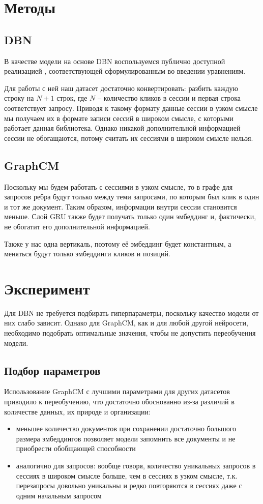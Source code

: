 \documentclass[diploma]{nanolab2015}
\begin{document}
\section{Методы}
\subsection{DBN}
В качестве модели на основе DBN воспользуемся публично доступной реализацией \cite{dbngithub}, соответствующей сформулированным во введении уравнениям.

Для работы с ней наш датасет достаточно конвертировать: разбить каждую строку на $N+1$ строк, где $N$ -- количество кликов в сессии и первая строка соответствует запросу. Приводя к такому формату данные сессии в узком смысле мы получаем их в формате записи сессий в широком смысле, с которыми работает данная библиотека. Однако никакой дополнительной информацией сессии не обогащаются, потому считать их сессиями в широком смысле нельзя.

\subsection{GraphCM}
Поскольку мы будем работать с сессиями в узком смысле, то в графе для запросов ребра будут только между теми запросами, по которым был клик в один и тот же документ. Таким образом, информации внутри сессии становится меньше. Слой GRU также будет получать только один эмбеддинг и, фактически, не обогатит его дополнительной информацией.

Также у нас одна вертикаль, поэтому её эмбеддинг будет константным, а меняться будут только эмбеддинги кликов и позиций.
\section{Эксперимент}
Для DBN не требуется подбирать гиперпараметры, поскольку качество модели от них слабо зависит. Однако для GraphCM, как и для любой другой нейросети, необходимо подобрать оптимальные значения, чтобы не допустить переобучения модели.
\subsection{Подбор параметров}
Использование GraphCM с лучшими параметрами для других датасетов приводило к переобучению, что достаточно обоснованно из-за различий в количестве данных, их природе и организации:
\begin{itemize}
    \item меньшее количество документов при сохранении достаточно большого размера эмбеддингов позволяет модели запомнить все документы и не приобрести обобщающей способности
    \item аналогично для запросов: вообще говоря, количество уникальных запросов в сессиях в широком смысле больше, чем в сессиях в узком смысле, т.к. перезапросы довольно уникальны и редко повторяются в сессиях даже с одним начальным запросом
\end{itemize}
\end{document}
